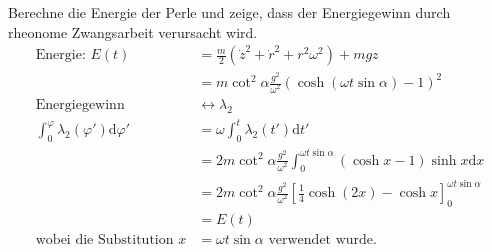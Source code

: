 \begin{enumeralph}
	\item Berechne  die  Energie  der  Perle  und  zeige,  dass  der  Energiegewinn  durch  rheonome Zwangsarbeit verursacht wird.
	\begin{align*}
	\text{Energie: }E(t)&=\frac{m}{2}(\dot{z}^2+\dot{r}^2+r^2\omega^2)+mgz\\
	&=m\cot^2\alpha\frac{g^2}{\omega^2}(\cosh(\omega t \sin\alpha)-1)^2\\
	\text{Energiegewinn}&\leftrightarrow\lambda_2\\
	\int_{0}^{\varphi}\lambda_2(\varphi')\mathrm{d}\varphi'&=\omega\int_{0}^{t}\lambda_2(t')\mathrm{d}t'\\
	&=2m\cot^2\alpha\frac{g^2}{\omega^2}\int_{0}^{\omega t\sin\alpha}(\cosh x -1)\sinh x \mathrm{d}x\\
	&=2m\cot^2\alpha\frac{g^2}{\omega^2}\left[\frac{1}{4}\cosh(2x)-\cosh x\right]_0^{\omega t\sin\alpha}\\
	&=E(t)\\
	\text{wobei die Substitution }x&=\omega t \sin\alpha \text{ verwendet wurde.}
	\end{align*}
\end{enumeralph}


